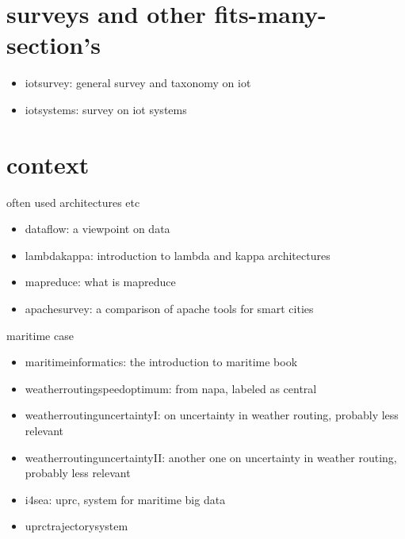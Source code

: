 \documentclass{article}
\begin{document}


\chapter{surveys and other fits-many-section's}

\begin{itemize}
    \item \cite{iotsurvey} iotsurvey: general survey and taxonomy on iot
    \item \cite{iotsystems} iotsystems: survey on iot systems
\end{itemize}

\chapter{context}

often used architectures etc

\begin{itemize}
    \item \cite{dataflow} dataflow: a viewpoint on data
    \item \cite{lambdakappa} lambdakappa: introduction to lambda and kappa architectures
    \item \cite{mapreduce} mapreduce: what is mapreduce
    \item \cite{apachesurvey} apachesurvey: a comparison of apache tools for smart cities
\end{itemize}

maritime case

\begin{itemize}
    \item \cite{maritimeinformatics} maritimeinformatics: the introduction to maritime book
    \item \cite{weatherroutingspeedoptimum} weatherroutingspeedoptimum: from napa, labeled as central
    \item \cite{weatherroutinguncertaintyI} weatherroutinguncertaintyI: on uncertainty in weather routing, probably less relevant
     \item \cite{weatherroutinguncertaintyII} weatherroutinguncertaintyII: another one on uncertainty in weather routing, probably less relevant
     \item \cite{i4sea} i4sea: uprc, system for maritime big data
     \item \cite{uprctrajectorysystem} uprctrajectorysystem
\end{itemize}
\end{document}
